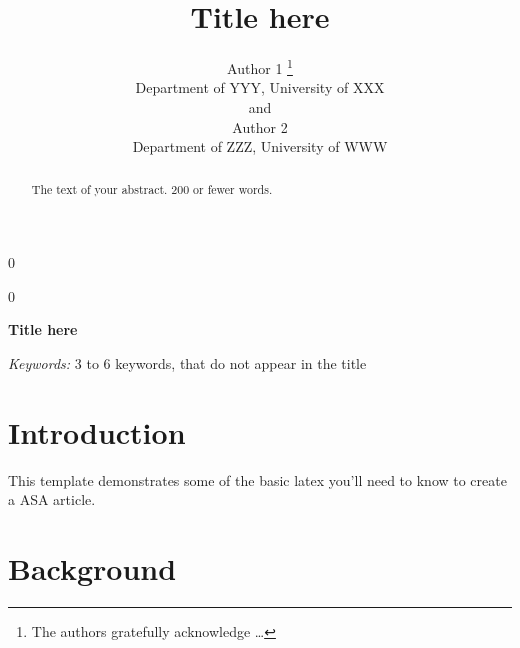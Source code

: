 \documentclass[12pt]{article}
\newcommand{\blind}{0}
\begin{document}
\def\spacingset#1{\renewcommand{\baselinestretch}%
{#1}\small\normalsize} \spacingset{1}



\blind
{
  \title{\bf Title here}

  \author{
        Author 1 \thanks{The authors gratefully acknowledge \ldots{}} \\
    Department of YYY, University of XXX\\
     and \\     Author 2 \\
    Department of ZZZ, University of WWW\\
      }
  \maketitle
} \fi

\blind
{
  \bigskip
  \bigskip
  \bigskip
  \begin{center}
    {\LARGE\bf Title here}
  \end{center}
  \medskip
} \fi

\bigskip
\begin{abstract}
The text of your abstract. 200 or fewer words.
\end{abstract}

\noindent%
{\it Keywords:} 3 to 6 keywords, that do not appear in the title
\vfill

\newpage
\spacingset{1.45} %

\hypertarget{introduction}{%
\section{Introduction}\label{introduction}}

This template demonstrates some of the basic latex you'll need to know
to create a ASA article.

\section{Background}
\label{sec:background}
\end{document}
